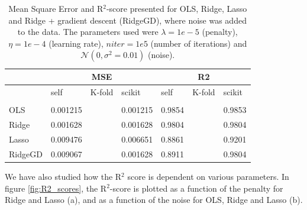 \begin{table} [H]
	\caption{Mean Square Error and R$^2$-score presented for OLS, Ridge, Lasso and Ridge + gradient descent (RidgeGD), where noise was added to the data. The parameters used were $\lambda=1e-5$ (penalty), $\eta=1e-4$ (learning rate), $niter=1e5$ (number of iterations) and $\mathcal{N}(0, \sigma^2=0.01)$ (noise). \vspace{2mm}}
	\begin{tabularx}{\textwidth}{l|XXX|XXX} \hline\hline
		\label{tab:franke_error}
		& \multicolumn{3}{c}{\textbf{MSE}}&\multicolumn{3}{c}{\textbf{R2}}\\ \hline
		&self&K-fold&scikit&self&K-fold&scikit\\ \hline \\
		OLS & 0.001215 && 0.001215 & 0.9854 && 0.9853\\
		Ridge & 0.001628 && 0.001628 & 0.9804 && 0.9804 \\
		Lasso & 0.009476 && 0.006651 & 0.8861 && 0.9201 \\
		RidgeGD & 0.009067 && 0.001628 & 0.8911 && 0.9804 \\ \hline
	\end{tabularx}
\end{table}

We have also studied how the R$^2$ score is dependent on various parameters. In figure \eqref{fig:R2_scores}, the R$^2$-score is plotted as a function of the penalty for Ridge and Lasso (a), and as a function of the noise for OLS, Ridge and Lasso (b).

